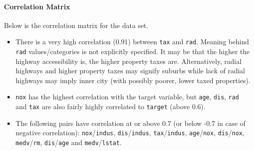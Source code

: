 \documentclass[]{article}
\providecommand{\tightlist}{%
  \setlength{\itemsep}{0pt}\setlength{\parskip}{0pt}}
\let\oldparagraph\paragraph
\renewcommand{\paragraph}[1]{\oldparagraph{#1}\mbox{}}
\begin{document}
\hypertarget{correlation-matrix}{%
\paragraph{Correlation Matrix}\label{correlation-matrix}}

Below is the correlation matrix for the data set.

\begin{itemize}
\tightlist
\item
  There is a very high correlation (0.91) between \texttt{tax} and
  \texttt{rad}. Meaning behind \texttt{rad} values/categories is not
  explicitly specified. It may be that the higher the highway
  accessibility is, the higher property taxes are. Alternatively, radial
  highways and higher property taxes may signify suburbs while lack of
  radial highways may imply inner city (with possibly poorer, lower
  taxed properties).
\item
  \texttt{nox} has the highest correlation with the target variable, but
  \texttt{age}, \texttt{dis}, \texttt{rad} and \texttt{tax} are also
  fairly highly correlated to \texttt{target} (above 0.6).
\item
  The following pairs have correlation at or above 0.7 (or below -0.7 in
  case of negative correlation): \texttt{nox}/\texttt{indus},
  \texttt{dis}/\texttt{indus}, \texttt{tax}/\texttt{indus},
  \texttt{age}/\texttt{nox}, \texttt{dis}/\texttt{nox},
  \texttt{medv}/\texttt{rm}, \texttt{dis}/\texttt{age} and
  \texttt{medv}/\texttt{lstat}.
\end{itemize}
\end{document}
